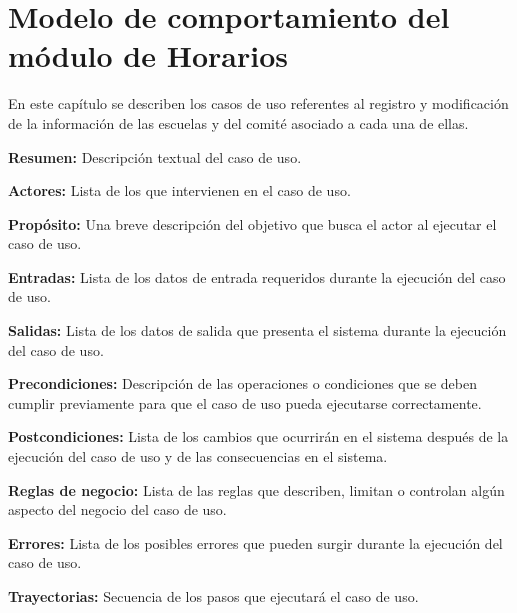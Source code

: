 

\chapter{Modelo de comportamiento del módulo de Horarios}

En este capítulo se describen los casos de uso referentes al registro y modificación de la información de las escuelas y del comité asociado a cada una de ellas. 

\bigskip

     \begin{objetivos}
	\item {\bf Resumen:} Descripción textual del caso de uso.
	\item {\bf Actores:} Lista de los 
	 que intervienen en el caso de uso.
	\item {\bf Propósito:} Una breve descripción del objetivo que busca el actor al ejecutar el caso de uso.
	\item {\bf Entradas:} Lista de los datos de entrada requeridos durante la ejecución del caso de uso.
	\item {\bf Salidas:} Lista de los datos de salida que presenta el sistema durante la ejecución del caso de uso.
	\item {\bf Precondiciones:} Descripción de las operaciones o condiciones que se deben cumplir previamente para que el caso de uso pueda ejecutarse correctamente.
	\item {\bf Postcondiciones:} Lista de los cambios que ocurrirán en el sistema después de la ejecución del caso de uso y de las consecuencias en el sistema.
	\item {\bf Reglas de negocio:} Lista de las reglas que describen, limitan o controlan algún aspecto del negocio del caso de uso.
	\item {\bf Errores:} Lista de los posibles errores que pueden surgir durante la ejecución del caso de uso.
	\item {\bf Trayectorias:} Secuencia de los pasos que ejecutará el caso de uso.
    \end{objetivos}


 	 	


	
